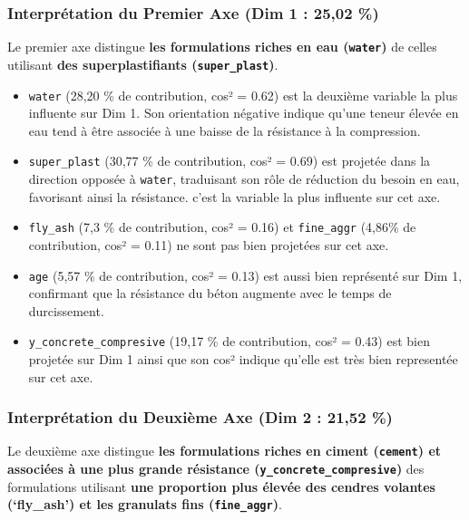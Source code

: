 \documentclass[
  12pt,
]{article}
\providecommand{\tightlist}{%
  \setlength{\itemsep}{0pt}\setlength{\parskip}{0pt}}
\begin{document}
\subsubsection{Interprétation du Premier Axe (Dim 1 : 25,02
\%)}\label{interpruxe9tation-du-premier-axe-dim-1-2502}

Le premier axe distingue \textbf{les formulations riches en eau
(\texttt{water})} de celles utilisant \textbf{des superplastifiants
(\texttt{super\_plast})}.

\begin{itemize}
\tightlist
\item
  \texttt{water} (28,20 \% de contribution, cos² = 0.62) est la deuxième
  variable la plus influente sur Dim 1. Son orientation négative indique
  qu'une teneur élevée en eau tend à être associée à une baisse de la
  résistance à la compression.
\item
  \texttt{super\_plast} (30,77 \% de contribution, cos² = 0.69) est
  projetée dans la direction opposée à \texttt{water}, traduisant son
  rôle de réduction du besoin en eau, favorisant ainsi la résistance.
  c'est la variable la plus influente sur cet axe.
\item
  \texttt{fly\_ash} (7,3 \% de contribution, cos² = 0.16) et
  \texttt{fine\_aggr} (4,86\% de contribution, cos² = 0.11) ne sont pas
  bien projetées sur cet axe.
\item
  \texttt{age} (5,57 \% de contribution, cos² = 0.13) est aussi bien
  représenté sur Dim 1, confirmant que la résistance du béton augmente
  avec le temps de durcissement.
\item
  \texttt{y\_concrete\_compresive} (19,17 \% de contribution, cos² =
  0.43) est bien projetée sur Dim 1 ainsi que son cos² indique qu'elle
  est très bien representée sur cet axe.
\end{itemize}

\subsubsection{Interprétation du Deuxième Axe (Dim 2 : 21,52
\%)}\label{interpruxe9tation-du-deuxiuxe8me-axe-dim-2-2152}

Le deuxième axe distingue \textbf{les formulations riches en ciment
(\texttt{cement}) et associées à une plus grande résistance
(\texttt{y\_concrete\_compresive})} des formulations utilisant
\textbf{une proportion plus élevée des cendres volantes (`fly\_ash') et
les granulats fins (\texttt{fine\_aggr})}.
\end{document}
